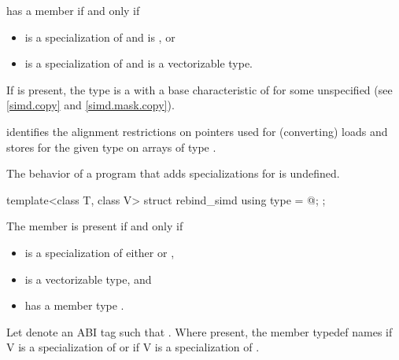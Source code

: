 \begin{itemdescr}
\pnum
{} has a member  if and only if
\begin{itemize}
  \item {} is a specialization of  and  is , or
  \item {} is a specialization of  and  is a vectorizable type.
\end{itemize}

\pnum
If  is present, the type  is a  with
a base characteristic of  for some unspecified
 (see \ref{simd.copy} and \ref{simd.mask.copy}). \begin{note} identifies the
alignment restrictions on pointers used for (converting) loads and stores for the given type
 on arrays of type .\end{note}

\pnum
The behavior of a program that adds specializations for  is undefined.
\end{itemdescr}

\begin{itemdecl}
template<class T, class V> struct rebind_simd { using type = @\seebelow@; };
\end{itemdecl}

\begin{itemdescr}
  \pnum
  The member  is present if and only if
  \begin{itemize}
    \item {} is a specialization of either  or
      ,
    \item {} is a vectorizable type, and
    \item {} has a member type .
  \end{itemize}

  \pnum
  Let  denote an ABI tag such that .
  Where present, the member typedef  names  if \tcode V is a specialization of  or
   if \tcode V is a specialization of
  .
\end{itemdescr}

